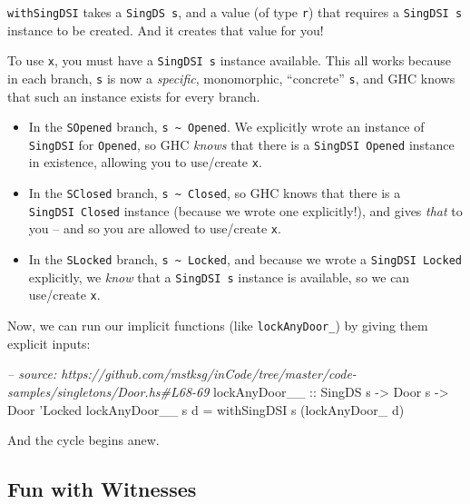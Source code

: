 \documentclass[]{article}
\newenvironment{Shaded}{}{}
\newcommand{\DataTypeTok}[1]{\textcolor[rgb]{0.56,0.13,0.00}{#1}}
\newcommand{\CharTok}[1]{\textcolor[rgb]{0.25,0.44,0.63}{#1}}
\newcommand{\CommentTok}[1]{\textcolor[rgb]{0.38,0.63,0.69}{\textit{#1}}}
\newcommand{\OtherTok}[1]{\textcolor[rgb]{0.00,0.44,0.13}{#1}}
\newcommand{\FunctionTok}[1]{\textcolor[rgb]{0.02,0.16,0.49}{#1}}
\newcommand{\NormalTok}[1]{#1}
\begin{document}
\texttt{withSingDSI} takes a \texttt{SingDS\ s}, and a value (of type
\texttt{r}) that requires a \texttt{SingDSI\ s} instance to be created. And it
creates that value for you!

To use \texttt{x}, you must have a \texttt{SingDSI\ s} instance available. This
all works because in each branch, \texttt{s} is now a \emph{specific},
monomorphic, ``concrete'' \texttt{s}, and GHC knows that such an instance exists
for every branch.

\begin{itemize}
\tightlist
\item
  In the \texttt{SOpened} branch,
  \texttt{s\ \textasciitilde{}\ \textquotesingle{}Opened}. We explicitly wrote
  an instance of \texttt{SingDSI} for \texttt{\textquotesingle{}Opened}, so GHC
  \emph{knows} that there is a \texttt{SingDSI\ \textquotesingle{}Opened}
  instance in existence, allowing you to use/create \texttt{x}.
\item
  In the \texttt{SClosed} branch,
  \texttt{s\ \textasciitilde{}\ \textquotesingle{}Closed}, so GHC knows that
  there is a \texttt{SingDSI\ \textquotesingle{}Closed} instance (because we
  wrote one explicitly!), and gives \emph{that} to you -- and so you are allowed
  to use/create \texttt{x}.
\item
  In the \texttt{SLocked} branch,
  \texttt{s\ \textasciitilde{}\ \textquotesingle{}Locked}, and because we wrote
  a \texttt{SingDSI\ \textquotesingle{}Locked} explicitly, we \emph{know} that a
  \texttt{SingDSI\ s} instance is available, so we can use/create \texttt{x}.
\end{itemize}

Now, we can run our implicit functions (like \texttt{lockAnyDoor\_}) by giving
them explicit inputs:

\begin{Shaded}
\begin{Highlighting}[]
\CommentTok{-- source: https://github.com/mstksg/inCode/tree/master/code-samples/singletons/Door.hs#L68-69}
\OtherTok{lockAnyDoor__ ::} \DataTypeTok{SingDS}\NormalTok{ s }\OtherTok{->} \DataTypeTok{Door}\NormalTok{ s }\OtherTok{->} \DataTypeTok{Door} \CharTok{'Locked}
\NormalTok{lockAnyDoor__ s d }\FunctionTok{=}\NormalTok{ withSingDSI s (lockAnyDoor_ d)}
\end{Highlighting}
\end{Shaded}

And the cycle begins anew.

\subsection{Fun with Witnesses}\label{fun-with-witnesses}
\end{document}
